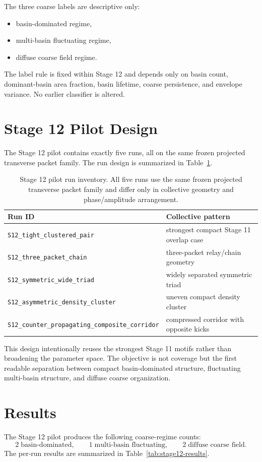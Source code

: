 \documentclass[11pt]{article}
\begin{document}
The three coarse labels are descriptive only:
\begin{itemize}
\item basin-dominated regime,
\item multi-basin fluctuating regime,
\item diffuse coarse field regime.
\end{itemize}
The label rule is fixed within Stage 12 and depends only on basin count, dominant-basin area fraction, basin lifetime, coarse persistence, and envelope variance. No earlier classifier is altered.

\section{Stage 12 Pilot Design}
The Stage 12 pilot contains exactly five runs, all on the same frozen projected transverse packet family. The run design is summarized in Table~\ref{tab:stage12-runs}.

\begin{table}[t]
\centering
\begin{tabular}{ll}
\hline
Run ID & Collective pattern \\
\hline
\texttt{S12\_tight\_clustered\_pair} & strongest compact Stage 11 overlap case \\
\texttt{S12\_three\_packet\_chain} & three-packet relay/chain geometry \\
\texttt{S12\_symmetric\_wide\_triad} & widely separated symmetric triad \\
\texttt{S12\_asymmetric\_density\_cluster} & uneven compact density cluster \\
\texttt{S12\_counter\_propagating\_composite\_corridor} & compressed corridor with opposite kicks \\
\hline
\end{tabular}
\caption{Stage 12 pilot run inventory. All five runs use the same frozen projected transverse packet family and differ only in collective geometry and phase/amplitude arrangement.}
\label{tab:stage12-runs}
\end{table}

This design intentionally reuses the strongest Stage 11 motifs rather than broadening the parameter space. The objective is not coverage but the first readable separation between compact basin-dominated structure, fluctuating multi-basin structure, and diffuse coarse organization.

\section{Results}
The Stage 12 pilot produces the following coarse-regime counts:
\begin{equation}
2\;\text{basin-dominated},\qquad 1\;\text{multi-basin fluctuating},\qquad 2\;\text{diffuse coarse field}.
\end{equation}
The per-run results are summarized in Table~\ref{tab:stage12-results}.
\end{document}
